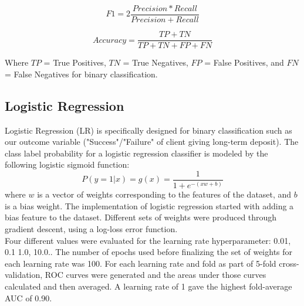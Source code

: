 \documentclass[11pt]{article}
\begin{document}
\begin{equation}
F1 = 2 \frac{Precision * Recall}{Precision + Recall}
\label{eqB}
\end{equation}

\begin{equation}
Accuracy = \frac{TP+TN}{TP+TN+FP+FN}
\label{eqB}
\end{equation}
    

Where $TP$ = True Positives, $TN$ = True Negatives, $FP$ = False Positives, and $FN$ = False Negatives for binary classification.

\subsection{Logistic Regression}
\label{SS:4-1}

Logistic Regression (LR) is specifically designed for binary classification such as our outcome variable ("Success"/"Failure" of client giving long-term deposit). The class label probability for a logistic regression classifier is modeled by the following logistic sigmoid function: 
\begin{equation}
\label{eqA}
P(y=1|x)=g(x)=\frac{1}{1+e^{-(xw+b)}}
\end{equation}
where $w$ is a vector of weights corresponding to the features of the dataset, and $b$ is a bias weight. The implementation of logistic regression started with adding a bias feature to the dataset. Different sets of weights were produced through gradient descent, using a log-loss error function.  \\
 
Four different values were evaluated for the learning rate hyperparameter: 0.01, 0.1 1.0, 10.0.. The number of epochs used before finalizing the set of weights for each learning rate was 100. For each learning rate and fold as part of 5-fold cross-validation, ROC curves were generated and the areas under those curves calculated and then averaged. A learning rate of 1 gave the highest fold-average AUC of 0.90. \\
\end{document}
